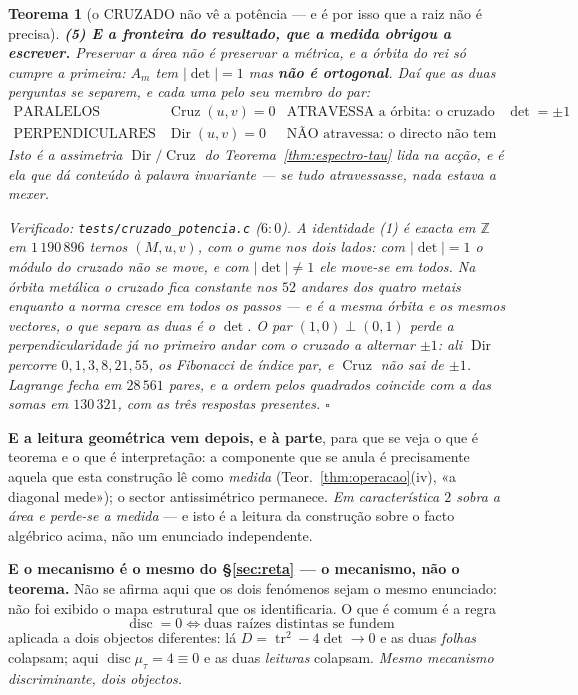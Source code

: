 \documentclass[11pt,a4paper]{article}
\newtheorem{teorema}{Teorema}
\newcommand{\code}[1]{\texttt{\small #1}}
\begin{document}
\begin{teorema}[o CRUZADO não vê a potência --- e é por isso que a raiz não é
precisa]
\textbf{(5) E a fronteira do resultado, que a medida obrigou a escrever.} Preservar a
\emph{área} não é preservar a \emph{métrica}, e a órbita do rei só cumpre a primeira:
$A_m$ tem $|\det|=1$ mas \textbf{não é ortogonal}. Daí que as duas perguntas se separem,
e cada uma pelo seu membro do par:
\[
\boxed{
\begin{array}{lll}
\text{PARALELOS} & \operatorname{Cruz}(u,v)=0 & \text{ATRAVESSA a órbita: o cruzado
transforma-se por }\det=\pm1\\[2pt]
\text{PERPENDICULARES} & \operatorname{Dir}(u,v)=0 & \text{NÃO atravessa: o directo não
tem lei de transformação}
\end{array}}
\]
Isto \emph{é} a assimetria $\operatorname{Dir}/\operatorname{Cruz}$ do
Teorema~\ref{thm:espectro-tau} lida na acção, e é ela que dá conteúdo à palavra
\emph{invariante} --- se tudo atravessasse, nada estava a mexer.

\emph{Verificado:} \code{tests/cruzado\_potencia.c} ($6{:}0$). A identidade (1) é exacta em
$\mathbb{Z}$ em $1\,190\,896$ ternos $(M,u,v)$, com o gume nos dois lados: com
$|\det|=1$ o módulo do cruzado não se move, e com $|\det|\neq1$ ele move-se em
\emph{todos}. Na órbita metálica o cruzado fica constante nos $52$ andares dos quatro
metais enquanto a norma cresce em todos os passos --- e é a mesma órbita e os mesmos
vectores, o que separa as duas é o $\det$. O par $(1,0)\perp(0,1)$ perde a
perpendicularidade já no primeiro andar com o cruzado a alternar $\pm1$: ali $\operatorname{Dir}$
percorre $0,1,3,8,21,55$, os Fibonacci de índice par, e $\operatorname{Cruz}$ não sai de
$\pm1$. Lagrange fecha em $28\,561$ pares, e a ordem pelos quadrados coincide com a das
somas em $130\,321$, com as três respostas presentes. $\square$
\end{teorema}

\noindent\textbf{E a leitura geométrica vem depois, e à parte}, para que se veja o que é
teorema e o que é interpretação: a componente que se anula é precisamente aquela que
esta construção lê como \emph{medida} (Teor.~\ref{thm:operacao}(iv), «a diagonal mede»);
o sector antissimétrico permanece. \emph{Em característica $2$ sobra a área e perde-se a
medida} --- e isto é a leitura da construção sobre o facto algébrico acima, não um
enunciado independente.

\medskip
\noindent\textbf{E o mecanismo é o mesmo do \S\ref{sec:reta} --- o mecanismo, não o
teorema.} Não se afirma aqui que os dois fenómenos sejam o mesmo enunciado: não foi
exibido o mapa estrutural que os identificaria. O que é comum é a regra
\[
\boxed{\;\operatorname{disc}=0
\iff \text{duas raízes distintas se fundem}\;}
\]
aplicada a dois objectos diferentes: lá $D=\operatorname{tr}^{2}-4\det\to0$ e as duas
\emph{folhas} colapsam; aqui $\operatorname{disc}\mu_\tau=4\equiv0$ e as duas
\emph{leituras} colapsam. \emph{Mesmo mecanismo discriminante, dois objectos.}
\end{document}
